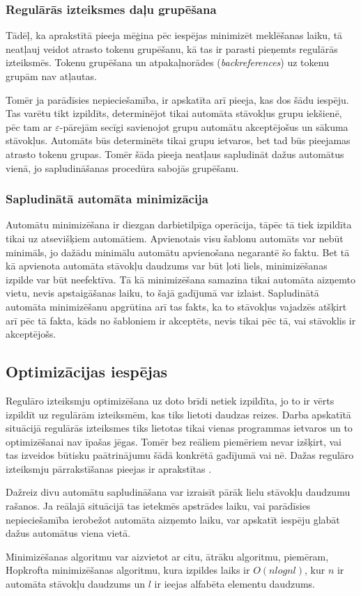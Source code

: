 \subsubsection{Regulārās izteiksmes daļu grupēšana}

Tādēļ, ka aprakstītā pieeja mēģina pēc iespējas minimizēt meklēšanas laiku, tā neatļauj veidot atrasto tokenu grupēšanu, kā tas ir parasti pieņemts regulārās izteiksmēs. Tokenu grupēšana un atpakaļnorādes (\emph{backreferences}) uz tokenu grupām nav atļautas.

Tomēr ja parādīsies nepieciešamība, ir apskatīta arī pieeja, kas dos šādu iespēju. Tas varētu tikt izpildīts, determinējot tikai automāta stāvokļus grupu iekšienē, pēc tam ar $\varepsilon$-pārejām secīgi savienojot grupu automātu akceptējošus un sākuma stāvokļus. Automāts būs determinēts tikai grupu ietvaros, bet tad būs pieejamas atrasto tokenu grupas. Tomēr šāda pieeja neatļaus sapludināt dažus automātus vienā, jo sapludināšanas procedūra sabojās grupēšanu.

\subsubsection{Sapludinātā automāta minimizācija}

Automātu minimizēšana ir diezgan darbietilpīga operācija, tāpēc tā tiek izpildīta tikai uz atsevišķiem automātiem. Apvienotais visu šablonu automāts var nebūt minimāls, jo dažādu minimālu automātu apvienošana negarantē šo faktu. Bet tā kā apvienota automāta stāvokļu daudzums var būt ļoti liels, minimizēšanas izpilde var būt neefektīva. Tā kā minimizēšana samazina tikai automāta aizņemto vietu, nevis apstaigāšanas laiku, to šajā gadījumā var izlaist. Sapludinātā automāta minimizēšanu apgrūtina arī tas fakts, ka to stāvokļus vajadzēs atšķirt arī pēc tā fakta, kāds no šabloniem ir akceptēts, nevis tikai pēc tā, vai stāvoklis ir akceptējošs.

\subsection{\label{subsec:solution_optimization}Optimizācijas iespējas}

Regulāro izteiksmju optimizēšana uz doto brīdi netiek izpildīta, jo to ir vērts izpildīt uz regulārām izteiksmēm, kas tiks lietoti daudzas reizes. Darba apskatītā situācijā regulārās izteiksmes tiks lietotas tikai vienas programmas ietvaros un to optimizēšanai nav īpašas jēgas. Tomēr bez reāliem piemēriem nevar izšķirt, vai tas izveidos būtisku paātrinājumu šādā konkrētā gadījumā vai nē. Dažas regulāro izteiksmju pārrakstīšanas pieejas ir aprakstītas \cite{Yu:FMR}.

Dažreiz divu automātu sapludināšana var izraisīt pārāk lielu stāvokļu daudzumu rašanos. Ja reālajā situācijā tas ietekmēs apstrādes laiku, vai parādīsies nepieciešamība ierobežot automāta aizņemto laiku, var apskatīt iespēju glabāt dažus automātus viena vietā. \cite{Yu:FMR}

Minimizēšanas algoritmu var aizvietot ar citu, ātrāku algoritmu, piemēram, Hopkrofta minimizēšanas algoritmu, kura izpildes laiks ir $O(n log n l)$, kur $n$ ir automāta stāvokļu daudzums un $l$ ir ieejas alfabēta elementu daudzums.\cite{Berstel:MA}